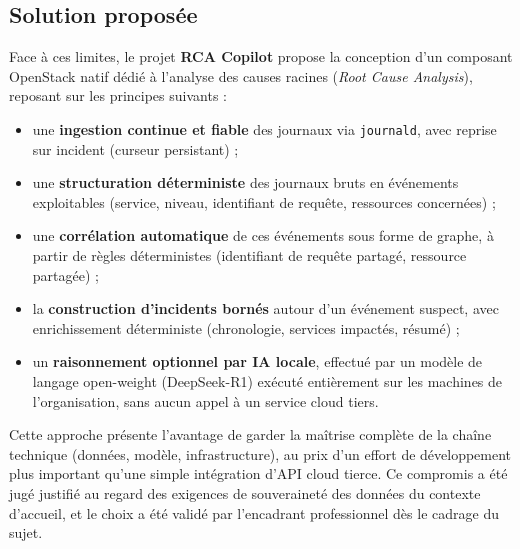 \documentclass[a4paper,11pt,oneside]{report}
\begin{document}
\subsection{Solution proposée}
Face à ces limites, le projet \textbf{RCA Copilot} propose la conception d'un composant OpenStack natif dédié à l'analyse des causes racines (\emph{Root Cause Analysis}), reposant sur les principes suivants :
\begin{itemize}
    \item une \textbf{ingestion continue et fiable} des journaux via \texttt{journald}, avec reprise sur incident (curseur persistant) ;
    \item une \textbf{structuration déterministe} des journaux bruts en événements exploitables (service, niveau, identifiant de requête, ressources concernées) ;
    \item une \textbf{corrélation automatique} de ces événements sous forme de graphe, à partir de règles déterministes (identifiant de requête partagé, ressource partagée) ;
    \item la \textbf{construction d'incidents bornés} autour d'un événement suspect, avec enrichissement déterministe (chronologie, services impactés, résumé) ;
    \item un \textbf{raisonnement optionnel par IA locale}, effectué par un modèle de langage open-weight (DeepSeek-R1) exécuté entièrement sur les machines de l'organisation, sans aucun appel à un service cloud tiers.
\end{itemize}
Cette approche présente l'avantage de garder la maîtrise complète de la chaîne technique (données, modèle, infrastructure), au prix d'un effort de développement plus important qu'une simple intégration d'API cloud tierce. Ce compromis a été jugé justifié au regard des exigences de souveraineté des données du contexte d'accueil, et le choix a été validé par l'encadrant professionnel dès le cadrage du sujet.
\end{document}
